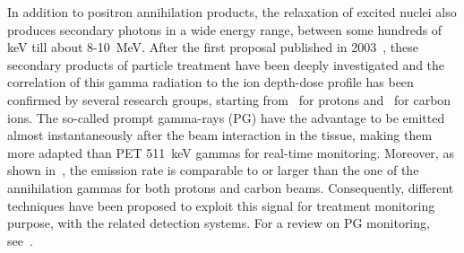 In addition to positron annihilation products, the relaxation of excited nuclei also produces secondary photons in a wide energy range, between some hundreds of keV till about 8-10~MeV. After the first proposal published in 2003~\cite{PG_first}, these secondary products of particle treatment have been deeply investigated and the correlation of this gamma radiation to the ion depth-dose profile has been confirmed by several research groups, starting from~\cite{Min_PG} for protons and~\cite{Testa_PG} for carbon ions. The so-called prompt gamma-rays (PG) have the advantage to be emitted almost instantaneously after the beam interaction in the tissue, making them more adapted than PET 511~keV gammas for real-time monitoring. Moreover, as shown in~\cite{Robert2013}, the emission rate is comparable to or larger than the one of the annihilation gammas for both protons and carbon beams. Consequently, different techniques have been proposed to exploit this signal for treatment monitoring purpose, with the related detection systems. For a review on PG monitoring, see~\cite{krimmer:hal-01585334}.

